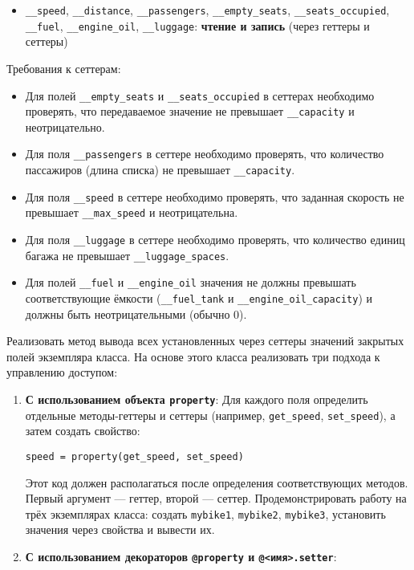 \begin{enumerate}
\begin{itemize}
    \item \texttt{\_\_speed}, \texttt{\_\_distance}, \texttt{\_\_passengers}, \texttt{\_\_empty\_seats}, \texttt{\_\_seats\_occupied}, \texttt{\_\_fuel}, \texttt{\_\_engine\_oil}, \texttt{\_\_luggage}: \textbf{чтение и запись} (через геттеры и сеттеры)
\end{itemize}
Требования к сеттерам:
\begin{itemize}
    \item Для полей \texttt{\_\_empty\_seats} и \texttt{\_\_seats\_occupied} в сеттерах необходимо проверять, что передаваемое значение не превышает \texttt{\_\_capacity} и неотрицательно.  
    \item Для поля \texttt{\_\_passengers} в сеттере необходимо проверять, что количество пассажиров (длина списка) не превышает \texttt{\_\_capacity}.  
    \item Для поля \texttt{\_\_speed} в сеттере необходимо проверять, что заданная скорость не превышает \texttt{\_\_max\_speed} и неотрицательна.  
    \item Для поля \texttt{\_\_luggage} в сеттере необходимо проверять, что количество единиц багажа не превышает \texttt{\_\_luggage\_spaces}.
    \item Для полей \texttt{\_\_fuel} и \texttt{\_\_engine\_oil} значения не должны превышать соответствующие ёмкости (\texttt{\_\_fuel\_tank} и \texttt{\_\_engine\_oil\_capacity}) и должны быть неотрицательными (обычно 0).
\end{itemize}
Реализовать метод вывода всех установленных через сеттеры значений закрытых полей экземпляра класса.
На основе этого класса реализовать три подхода к управлению доступом:
\begin{enumerate}
    \item \textbf{С использованием объекта \texttt{property}}:  
    Для каждого поля определить отдельные методы-геттеры и сеттеры (например, \texttt{get\_speed}, \texttt{set\_speed}), а затем создать свойство:  
    \begin{verbatim}
speed = property(get_speed, set_speed)
    \end{verbatim}  
    Этот код должен располагаться после определения соответствующих методов. Первый аргумент — геттер, второй — сеттер.  
    Продемонстрировать работу на трёх экземплярах класса: создать \texttt{mybike1}, \texttt{mybike2}, \texttt{mybike3}, установить значения через свойства и вывести их.
    \item \textbf{С использованием декораторов \texttt{@property} и \texttt{@<имя>.setter}}:  

\end{enumerate}
\end{enumerate}
